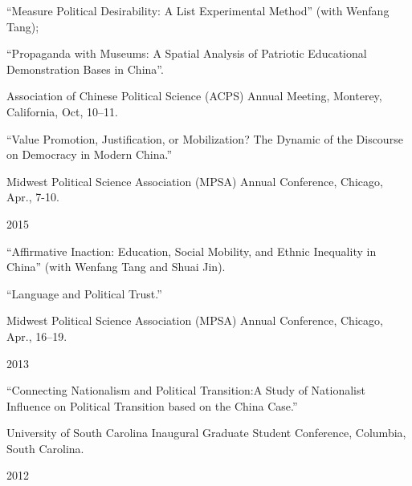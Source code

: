 \documentclass[10.5pt,]{article}
\providecommand{\tightlist}{%
	\setlength{\itemsep}{0pt}\setlength{\parskip}{0pt}}
\renewenvironment{itemize}{
	\begin{list}{}{
			\setlength{\leftmargin}{1.5em}
		}
	}{
	\end{list}
}
\begin{document}
\begin{itemize}
  \begin{itemize}
  \tightlist
  \item
    ``Measure Political Desirability: A List Experimental Method'' (with
    Wenfang Tang);
  \item
    ``Propaganda with Museums: A Spatial Analysis of Patriotic
    Educational Demonstration Bases in China''.

    \begin{itemize}
    \tightlist
    \item
      \footnotesize Association of Chinese Political Science (ACPS)
      Annual Meeting, Monterey, California, Oct, 10--11.
    \end{itemize}
  \item
    ``Value Promotion, Justification, or Mobilization? The Dynamic of
    the Discourse on Democracy in Modern China.''

    \begin{itemize}
    \tightlist
    \item
      \footnotesize Midwest Political Science Association (MPSA) Annual
      Conference, Chicago, Apr., 7-10.
    \end{itemize}
  \end{itemize}
\item
  2015

  \begin{itemize}
  \tightlist
  \item
    ``Affirmative Inaction: Education, Social Mobility, and Ethnic
    Inequality in China'' (with Wenfang Tang and Shuai Jin).
  \item
    ``Language and Political Trust.''

    \begin{itemize}
    \tightlist
    \item
      \footnotesize Midwest Political Science Association (MPSA) Annual
      Conference, Chicago, Apr., 16--19.
    \end{itemize}
  \end{itemize}
\item
  2013

  \begin{itemize}
  \tightlist
  \item
    ``Connecting Nationalism and Political Transition:A Study of
    Nationalist Influence on Political Transition based on the China
    Case.''

    \begin{itemize}
    \tightlist
    \item
      \footnotesize University of South Carolina Inaugural Graduate
      Student Conference, Columbia, South Carolina.
    \end{itemize}
  \end{itemize}
\item
  2012


\end{itemize}
\end{document}

